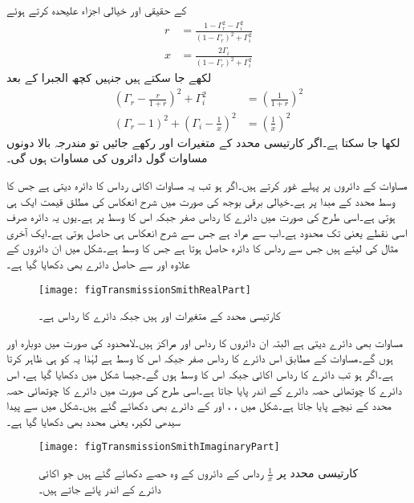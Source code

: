 کے حقیقی اور خیالی اجزاء علیحدہ کرتے ہوئے
\begin{align}
r&=\frac{1-\Gamma_r^2-\Gamma_i^2}{\left(1-\Gamma_r\right)^2+\Gamma_i^2}\\
x&=\frac{2\Gamma_i}{\left(1-\Gamma_r\right)^2+\Gamma_i^2}
\end{align}
لکھے جا سکتے ہیں جنہیں کچھ الجبرا کے بعد
\begin{align}
\left(\Gamma_r-\frac{r}{1+r}\right)^2+\Gamma_i^2&=\left(\frac{1}{1+r}\right)^2 \label{مساوات_ترسیلی_سمتھ_دائرہ_الف}\\
\left(\Gamma_r-1 \right)^2+\left(\Gamma_i-\frac{1}{x} \right)^2&=\left(\frac{1}{x}\right)^2  \label{مساوات_ترسیلی_سمتھ_دائرہ_ب}
\end{align}
لکھا جا سکتا ہے۔اگر کارتیسی محدد کے متغیرات  اور  رکھے جائیں تو مندرجہ بالا دونوں مساوات گول دائروں کی مساوات ہوں گی۔

مساوات  کے دائروں پر پہلے غور کرتے ہیں۔اگر  ہو تب یہ مساوات اکائی رداس کا دائرہ دیتی ہے جس کا وسط محدد کے  مبدا  پر ہے۔خیالی برقی بوجھ کی صورت میں شرح انعکاس کی مطلق قیمت ایک ہی ہوتی ہے۔اسی طرح  کی صورت میں دائرے کا رداس صفر جبکہ اس کا وسط   پر ہے۔یوں یہ دائرہ صرف اسی نقطے یعنی  تک محدود ہے۔اب  سے مراد  ہے جس سے شرح انعکاس  ہی حاصل ہوتی ہے۔ایک آخری مثال  کی لیتے ہیں جس سے  رداس کا دائرہ حاصل ہوتا ہے جس کا وسط  ہے۔شکل  میں ان دائروں کے علاوہ  اور  سے حاصل دائرے بھی  دکھایا گیا ہے۔ 

\begin{figure}
\centering
\texttt{[image: figTransmissionSmithRealPart]}
\caption{کارتیسی محدد کے متغیرات  اور  ہیں جبکہ دائرے کا رداس  ہے۔}
\label{شکل_ترسیلی_سمتھ-نقشہ_الف}
\end{figure}

مساوات  بھی دائرے دیتی ہے البتہ ان دائروں کا رداس  اور مراکز  ہیں۔لامحدود  کی صورت میں دوبارہ  اور  ہوں گے۔مساوات  کے مطابق اس دائرے کا رداس صفر جبکہ اس کا وسط  ہے لہٰذا یہ  کو ہی ظاہر کرتا ہے۔اگر  ہو تب دائرے کا رداس اکائی جبکہ اس کا وسط  ہوں گے۔جیسا شکل  میں دکھایا گیا ہے، اس دائرے کا چوتھائی حصہ  دائرے کے اندر پایا جاتا ہے۔اسی طرح  کی صورت میں دائرے کا چوتھائی حصہ   محدد کے نیچے پایا جاتا ہے۔شکل میں ، ،  اور  کے دائرے بھی دکھائے گئے ہیں۔شکل میں  سے پیدا سیدھی لکیر، یعنی  محدد بھی دکھایا گیا ہے۔
\begin{figure}
\centering
\texttt{[image: figTransmissionSmithImaginaryPart]}
\caption{کارتیسی محدد پر $\tfrac{1}{x}$ رداس کے دائروں کے وہ حصے دکھائے گئے ہیں جو اکائی دائرے کے اندر پائے جاتے ہیں۔}
\label{شکل_ترسیلی_سمتھ-نقشہ_ب}
\end{figure}

